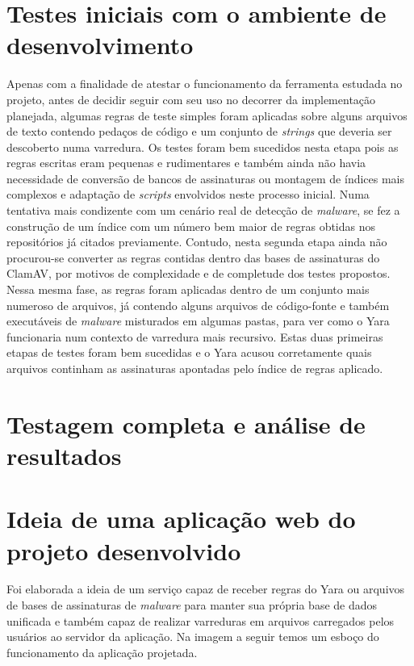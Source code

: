 \section{Testes iniciais com o ambiente de desenvolvimento}
\label{s.testesiniciais}

Apenas com a finalidade de atestar o funcionamento da ferramenta estudada no projeto,
antes de decidir seguir com seu uso no decorrer da implementação planejada, algumas regras
de teste simples foram aplicadas sobre alguns arquivos de texto contendo pedaços de
código e um conjunto de \textit{strings} que deveria ser descoberto numa varredura. Os testes
foram bem sucedidos nesta etapa pois as regras escritas eram pequenas e rudimentares e também
ainda não havia necessidade de conversão de bancos de assinaturas ou montagem de
índices mais complexos e adaptação de \textit{scripts} envolvidos neste processo inicial.
Numa tentativa mais condizente com um cenário real de detecção de \textit{malware},
se fez a construção de um índice com um número bem maior de regras obtidas nos repositórios
já citados previamente. Contudo, nesta segunda etapa ainda não procurou-se converter as
regras contidas dentro das bases de assinaturas do ClamAV, por motivos de complexidade
e de completude dos testes propostos. Nessa mesma fase, as regras foram aplicadas dentro
de um conjunto mais numeroso de arquivos, já contendo alguns arquivos de código-fonte
e também executáveis de \textit{malware} misturados em algumas pastas, para ver como
o Yara funcionaria num contexto de varredura mais recursivo. Estas duas primeiras etapas
de testes foram bem sucedidas e o Yara acusou corretamente quais arquivos continham
as assinaturas apontadas pelo índice de regras aplicado.



\section{Testagem completa e análise de resultados}
\label{s.testefull}

\section{Ideia de uma aplicação web do projeto desenvolvido}
\label{s.prototipo}

Foi elaborada a ideia de um serviço capaz de receber regras do Yara ou arquivos de bases de assinaturas de \textit{malware}
para manter sua própria base de dados unificada e também capaz de realizar varreduras em arquivos carregados pelos usuários
ao servidor da aplicação. Na imagem a seguir temos um esboço do funcionamento da aplicação projetada.

